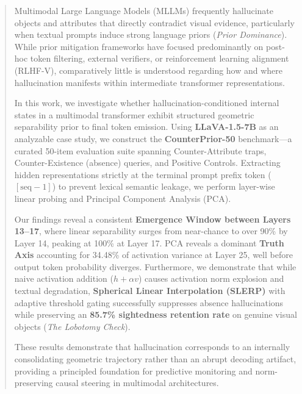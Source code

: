 \documentclass[11pt]{article}
\begin{document}
\newpage
\begin{abstract}
\begin{tcolorbox}[colback=gray!5, colframe=black, width=0.95\textwidth]
\noindent
Multimodal Large Language Models (MLLMs) frequently hallucinate objects and attributes that directly contradict visual evidence, particularly when textual prompts induce strong language priors (\textit{Prior Dominance}). While prior mitigation frameworks have focused predominantly on post-hoc token filtering, external verifiers, or reinforcement learning alignment (RLHF-V), comparatively little is understood regarding how and where hallucination manifests within intermediate transformer representations.

In this work, we investigate whether hallucination-conditioned internal states in a multimodal transformer exhibit structured geometric separability prior to final token emission. Using \textbf{LLaVA-1.5-7B} as an analyzable case study, we construct the \textbf{CounterPrior-50} benchmark---a curated 50-item evaluation suite spanning Counter-Attribute traps, Counter-Existence (absence) queries, and Positive Controls. Extracting hidden representations strictly at the terminal prompt prefix token ($[\text{seq}-1]$) to prevent lexical semantic leakage, we perform layer-wise linear probing and Principal Component Analysis (PCA).

Our findings reveal a consistent \textbf{Emergence Window between Layers 13--17}, where linear separability surges from near-chance to over 90\% by Layer 14, peaking at 100\% at Layer 17. PCA reveals a dominant \textbf{Truth Axis} accounting for 34.48\% of activation variance at Layer 25, well before output token probability diverges. Furthermore, we demonstrate that while naive activation addition ($h + \alpha v$) causes activation norm explosion and textual degradation, \textbf{Spherical Linear Interpolation (SLERP)} with adaptive threshold gating successfully suppresses absence hallucinations while preserving an \textbf{85.7\% sightedness retention rate} on genuine visual objects (\textit{The Lobotomy Check}).

These results demonstrate that hallucination corresponds to an internally consolidating geometric trajectory rather than an abrupt decoding artifact, providing a principled foundation for predictive monitoring and norm-preserving causal steering in multimodal architectures.
\end{tcolorbox}
\end{abstract}
\end{document}
